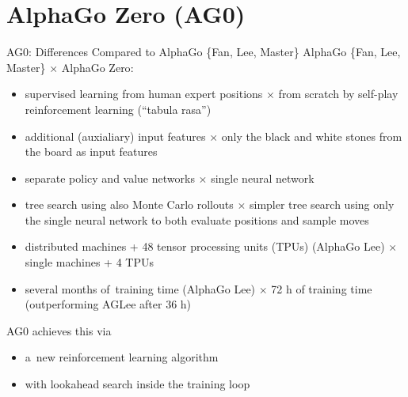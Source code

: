 \documentclass{beamer}
\begin{document}

  \section{AlphaGo Zero (AG0)}
  {

    \begin{frame}{AG0: Differences Compared to AlphaGo \{Fan, Lee, Master\}}
      AlphaGo \{Fan, Lee, Master\} $\times$ \alert{AlphaGo Zero}:
      \pause
      \begin{itemize}[<+->]
        \item supervised learning from human expert positions $\times$ \alert{from scratch by self-play reinforcement learning (``tabula rasa'')}
        \item additional (auxialiary) input features $\times$ \alert{only the black and white stones from the board as input features}
        \item separate policy and value networks $\times$ \alert{single neural network}
        \item tree search using also Monte Carlo rollouts $\times$ \alert{simpler tree search using only the single neural network to both evaluate positions and sample moves}
        \item distributed machines + 48 tensor processing units (TPUs) (AlphaGo Lee) $\times$ \alert{single machines + 4 TPUs}
        \item several months of~training time (AlphaGo Lee) $\times$ \alert{72 h of training time (outperforming AGLee after 36 h)}
      \end{itemize}
      \pause

      AG0 achieves this via
      \begin{itemize}[<+->]
        \item a~new \alert{reinforcement learning} algorithm
        \item with \alert{lookahead search inside the training loop}
      \end{itemize}
    \end{frame}

}
\end{document}
